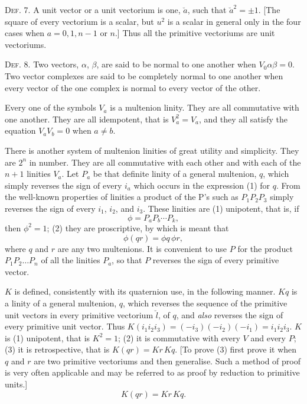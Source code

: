 \documentclass[11pt]{article}
\begin{document}
\noindent\textsc{Def. 7.} A unit vector or a unit vectorium is one, $\breve a$, such that $\breve a^2=\pm1$. [The square of every vectorium is a scalar, but $u^2$ is a scalar in general only in the four cases when $a=0,1,n-1$ or $n$.] Thus all the primitive vectoriums are unit vectoriums.

\noindent\textsc{Def. 8.} Two vectors, $\alpha$, $\beta$, are said to be normal to one another when $V_0\alpha\beta=0$. Two vector complexes are said to be completely normal to one another when every vector of the one complex is normal to every vector of the other.

\indent Every one of the symbols $V_a$ is a multenion linity. They are all commutative with one another. They are all idempotent, that is $V_a^2=V_a$, and they all satisfy the equation $V_aV_b=0$ when $a\ne b$.

\indent There is another system of multenion linities of great utility and simplicity. They are $2^n$ in number. They are all commutative with each other and with each of the $n+1$ linities $V_a$. Let $P_a$ be that definite linity of a general multenion, $q$, which simply reverses the sign of every $i_a$ which occurs in the expression (1) for $q$. From the well-known properties of linities a product of the P's such as $P_1P_2P_3$ simply reverses the sign of every $i_1$, $i_2$, and $i_3$. These linities are (1) unipotent, that is, if
\begin{equation}\phi=P_aP_b\cdots P_k,\tag{3}\end{equation}
then $\phi^2=1$; (2) they are proscriptive, by which is meant that
\begin{equation}\phi(qr)=\phi q\,\phi r,\tag{4}\end{equation}
where $q$ and $r$ are any two multenions. It is convenient to use $P$ for the product $P_1P_2\ldots P_n$ of all the linities $P_a$, so that $P$ reverses the sign of every primitive vector.

\indent $K$ is defined, consistently with its quaternion use, in the following manner. $Kq$ is a linity of a general multenion, $q$, which reverses the sequence of the primitive unit vectors in every primitive vectorium $\breve{l}$, of $q$, and \emph{also} reverses the sign of every primitive unit vector. Thus $K(i_1i_2i_3)=(-i_3)(-i_2)(-i_1)=i_1i_2i_3$. $K$ is (1) unipotent, that is $K^2=1$; (2) it is commutative with every $V$ and every $P$; (3) it is retrospective, that is $K(qr)=Kr\,Kq$. [To prove (3) first prove it when $q$ and $r$ are two primitive vectoriums and then generalise. Such a method of proof is very often applicable and may be referred to as proof by reduction to primitive units.]
\begin{equation}K(qr)=Kr\,Kq.\tag{5}\end{equation}
\end{document}
